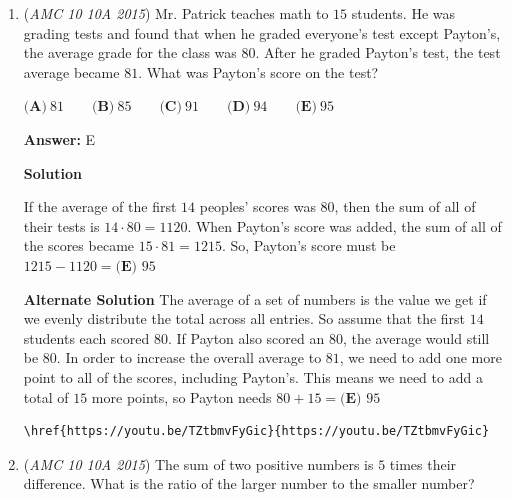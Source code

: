 \begin{enumerate}
\textbf{Solution 2}

Let Mia have $1$ egg. Sofia and Pablo would then have $2$ and $6$ eggs, respectively. If we split the eggs evenly, each would have $\frac{1 + 2 + 6}{3} = \frac{9}{3} = 3$ eggs. Since Sofia needs $3 - 2 = 1$ more egg, Pablo must give her $1$ of his $6$ eggs, or $\boxed{\textbf{(B) }\frac{1}{6}}$
\begin{verbatim}
\href{https://youtu.be/\_TR2cVdIRjw}{https://youtu.be/\_TR2cVdIRjw}
\end{verbatim}




	\item (\textit{AMC 10 10A 2015}) Mr. Patrick teaches math to $15$ students. He was grading tests and found that when he graded everyone's test except Payton's, the average grade for the class was $80$. After he graded Payton's test, the test average became $81$. What was Payton's score on the test?


 $\textbf{(A)}\ 81\qquad\textbf{(B)}\ 85\qquad\textbf{(C)}\ 91\qquad\textbf{(D)}\ 94\qquad\textbf{(E)}\ 95$

 \textbf{Answer: }E



\textbf{Solution}

If the average of the first $14$ peoples' scores was $80$, then the sum of all of their tests is $14 \cdot 80 = 1120$.  When Payton's score was added, the sum of all of the scores became $15 \cdot 81 = 1215$.  So, Payton's score must be $1215-1120 = \boxed{\textbf{(E) }95}$

 \textbf{Alternate Solution} The average of a set of numbers is the value we get if we evenly distribute the total across all entries. So assume that the first $14$ students each scored $80$. If Payton also scored an $80$, the average would still be $80$. In order to increase the overall average to $81$, we need to add one more point to all of the scores, including Payton's. This means we need to add a total of $15$ more points, so Payton needs $80+15 = \boxed{\textbf{(E) }95}$
\begin{verbatim}
\href{https://youtu.be/TZtbmvFyGic}{https://youtu.be/TZtbmvFyGic}
\end{verbatim}





	\item (\textit{AMC 10 10A 2015}) The sum of two positive numbers is $5$ times their difference. What is the ratio of the larger number to the smaller number?



\end{enumerate}
